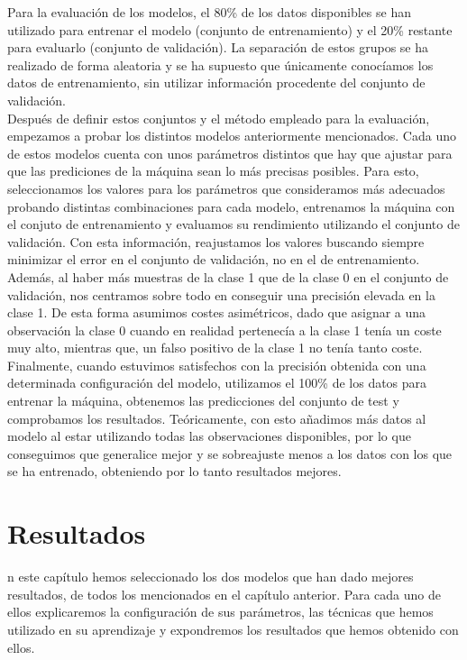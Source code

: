 \documentclass[journal,twoside]{JoPhA}
\begin{document}
Para la evaluación de los modelos, el 80\% de los datos disponibles se han utilizado para entrenar el modelo (conjunto de entrenamiento) y el 20\% restante para evaluarlo (conjunto de validación). La separación de estos grupos se ha realizado de forma aleatoria y se ha supuesto que únicamente conocíamos los datos de entrenamiento, sin utilizar información procedente del conjunto de validación. \\

Después de definir estos conjuntos y el método empleado para la evaluación, empezamos a probar los distintos modelos anteriormente mencionados. Cada uno de estos modelos cuenta con unos parámetros distintos que hay que ajustar para que las prediciones de la máquina sean lo más precisas posibles. Para esto, seleccionamos los valores para los parámetros que consideramos más adecuados probando distintas combinaciones para cada modelo, entrenamos la máquina con el conjuto de entrenamiento y evaluamos su rendimiento utilizando el conjunto de validación. Con esta información, reajustamos los valores buscando siempre minimizar el error en el conjunto de validación, no en el de entrenamiento. Además, al haber más muestras de la clase 1 que de la clase 0 en el conjunto de validación, nos centramos sobre todo en conseguir una precisión elevada en la clase 1. De esta forma asumimos costes asimétricos, dado que asignar a una observación la clase 0 cuando en realidad pertenecía a la clase 1 tenía un coste muy alto, mientras que, un falso positivo de la clase 1 no tenía tanto coste. \\

Finalmente, cuando estuvimos satisfechos con la precisión obtenida con una determinada configuración del modelo, utilizamos el 100\% de los datos para entrenar la máquina, obtenemos las predicciones del conjunto de test y comprobamos los resultados. Teóricamente, con esto añadimos más datos al modelo al estar utilizando todas las observaciones disponibles, por lo que conseguimos que generalice mejor y se sobreajuste menos a los datos con los que se ha entrenado, obteniendo por lo tanto resultados mejores. \\


\section{Resultados}
n este capítulo hemos seleccionado los dos modelos que han dado mejores resultados, de todos los mencionados en el capítulo anterior. Para cada uno de ellos explicaremos la configuración de sus parámetros, las técnicas que hemos utilizado en su aprendizaje y expondremos los resultados que hemos obtenido con ellos.
\end{document}
